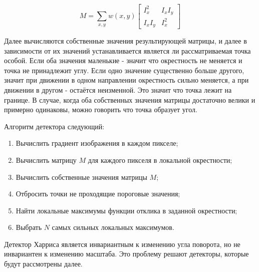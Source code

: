 \begin{equation}
    M = \sum_{x, y} w(x, y) \begin{bmatrix} I_x^2 & I_x I_y \\ I_x I_y & I_x^2 \end{bmatrix}
\end{equation}

Далее вычисляются собственные значения результирующей матрицы, и далее в зависимости от их значений устанавливается является ли рассматриваемая точка особой. Если оба значения маленькие - значит что окрестность не меняется и точка не принадлежит углу. Если одно значение существенно больше другого, значит при движении в одном направлении окрестность сильно меняется, а при движении в другом - остаётся неизменной. Это значит что точка лежит на границе. В случае, когда оба собственных значения матрицы достаточно велики и примерно одинаковы, можно говорить что точка образует угол.

\vspace{1mm}
Алгоритм детектора следующий:

\begin{enumerate}
    \item Вычислить градиент изображения в каждом пикселе;
    \item Вычислить матрицу $M$ для каждого пикселя в локальной окрестности;
    \item Вычислить собственные значения матрицы $M$;
    \item Отбросить точки не проходящие пороговые значения;
    \item Найти локальные максимумы функции отклика в заданной окрестности;
    \item Выбрать $N$ самых сильных локальных максимумов.
\end{enumerate}

Детектор Харриса является инвариантным к изменению угла поворота, но не инвариантен к изменению масштаба. Это проблему решают детекторы, которые будут рассмотрены далее.